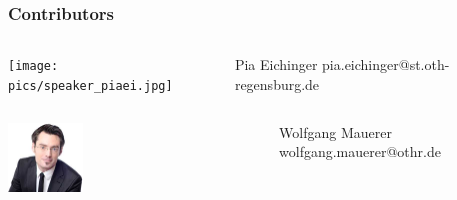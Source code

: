 \documentclass{beamer}
\begin{document}
	\begin{frame}
	\frametitle{Contributors}
	\begin{minipage}[c]{1.0\linewidth}
		\begin{columns}
		\begin{column}{0.35\textwidth}
			\begin{center}
     		\texttt{[image: pics/speaker\_piaei.jpg]}
			\end{center}
		\end{column}
		\begin{column}{0.7\textwidth}
		\begin{block}{Pia Eichinger}
			pia.eichinger@st.oth-regensburg.de
		\end{block}
		\end{column}
		\end{columns}

	\end{minipage}
	\begin{minipage}[c]{1.0\linewidth}
		\begin{columns}
		\begin{column}{0.35\textwidth}
			\begin{center}
     		\includegraphics[width=0.3\textwidth]{pics/speakers_mauerer.jpeg}
			\end{center}
		\end{column}
		\begin{column}{0.7\textwidth}
		\begin{block}{Wolfgang Mauerer}
			wolfgang.mauerer@othr.de
		\end{block}
		\end{column}
		\end{columns}


\end{minipage}
\end{frame}
\end{document}
